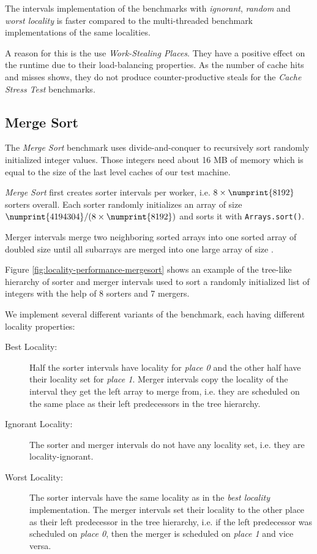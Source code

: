 The intervals implementation of the benchmarks with \emph{ignorant},
\emph{random} and \emph{worst locality} is faster compared to the
multi-threaded benchmark implementations of the same
localities. 

A reason for this is the use \emph{Work-Stealing Places}. They have a
positive effect on the runtime due to their load-balancing
properties. As the number of cache hits and misses shows, they do not
produce counter-productive steals for the \emph{Cache Stress Test}
benchmarks.

\subsection{Merge Sort}
\label{sec:locality-performance-merge-sort}

The \emph{Merge Sort} benchmark uses divide-and-conquer to recursively
sort  randomly initialized integer values. Those
integers need about 16 MB of memory which is equal to the size of the
last level caches of our test machine.

\emph{Merge Sort} first creates  sorter intervals per
worker, i.e. $8 \times \numprint{8192}$ sorters overall. Each sorter
randomly initializes an array of size $\numprint{4194304} / (8 \times
\numprint{8192})$ and sorts it with \lstinline!Arrays.sort()!.

Merger intervals merge two neighboring sorted arrays into one sorted
array of doubled size until all subarrays are merged into one large
array of size .

Figure \ref{fig:locality-performance-mergesort} shows an example of
the tree-like hierarchy of sorter and merger intervals used to sort a
randomly initialized list of integers with the help of 8 sorters and 7
mergers.

We implement several different variants of the benchmark, each having
different locality properties:

\begin{description}
\item[Best Locality:] Half the sorter intervals have locality for
  \emph{place 0} and the other half have their locality set for
  \emph{place 1}. Merger intervals copy the locality of the interval
  they get the left array to merge from, i.e. they are scheduled on
  the same place as their left predecessors in the tree hierarchy.
\item[Ignorant Locality:] The sorter and merger intervals do not have
  any locality set, i.e. they are locality-ignorant.
\item[Worst Locality:] The sorter intervals have the same locality as
  in the \emph{best locality} implementation. The merger intervals set
  their locality to the other place as their left predecessor in the
  tree hierarchy, i.e. if the left predecessor was scheduled on
  \emph{place 0}, then the merger is scheduled on \emph{place 1} and
  vice versa.
\end{description}

